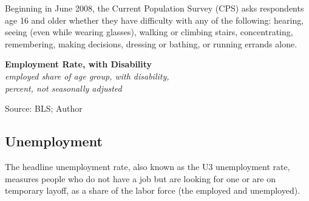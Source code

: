 \documentclass{report}
\makeatletter
\newcommand{\tbllink}[1]{\href{https://raw.githubusercontent.com/bdecon/US-chartbook/master/chartbook/data/#1}{\faTable}}
\newcommand*\short[1]{\expandafter\@gobbletwo\number\numexpr#1\relax}
\newcommand{\absnode}[3]{\node[below right, align=left] at (axis cs: #1,#2) {#3};}
\newcommand{\dateaxisticks}{
		date coordinates in=x, axis line style={draw=none},
		xmax={2023-11-30},
		max space between ticks=40,	    
		xtick={{1990-01-01}, {1992-01-01}, {1994-01-01}, 
			{1996-01-01}, {1998-01-01}, {2000-01-01}, 
			{2002-01-01}, {2004-01-01}, {2006-01-01},
			{2008-01-01}, {2010-01-01}, {2012-01-01}, {2014-01-01},
		    {2016-01-01}, {2018-01-01}, {2020-01-01}, {2022-01-01}, 
		    {2024-01-01}, {2026-01-01}},
		minor xtick={{1989-01-01}, {1991-01-01}, {1993-01-01},
			{1995-01-01}, {1997-01-01}, {1999-01-01}, 
			{2001-01-01}, {2003-01-01}, {2005-01-01}, {2007-01-01},
		    {2009-01-01}, {2011-01-01}, {2013-01-01}, {2015-01-01},
		    {2017-01-01}, {2019-01-01}, {2021-01-01}, {2023-01-01}, 
		    {2025-01-01}, {2027-01-01}},
		enlarge y limits={0.06}, enlarge x limits={0.01},
		xticklabel style={align=center, yshift=-2pt}, tick label style={inner sep=0pt},
		}
\newcommand{\bbar}[2]{extra #1 ticks = {{#2}}, extra #1 tick labels = ,
		extra #1 tick style = {grid=major, grid style={thick, black!25}},}
\newcommand{\stdline}[4]{\addplot[very thick, no markers, color=#1] 
		table [x=#2, y=#3, col sep=comma] {#4};	}
\newcommand{\recbars}{
		\fill[color=black!10] (axis cs:{2007-12-01},\pgfkeysvalueof{/pgfplots/ymin}) rectangle 
			(axis cs:{2009-07-01}, \pgfkeysvalueof{/pgfplots/ymax});
		\fill[color=black!10] (axis cs:{2020-02-01},\pgfkeysvalueof{/pgfplots/ymin}) rectangle 
			(axis cs:{2020-05-01}, \pgfkeysvalueof{/pgfplots/ymax});}
\makeatother
\begin{document}
{\begin{minipage}{0.76\textwidth}
Beginning in June 2008, the Current Population Survey (CPS) asks respondents age 16 and older whether they have difficulty with any of the following: hearing, seeing (even while wearing glasses), walking or climbing stairs, concentrating, remembering, making decisions, dressing or bathing, or running errands alone.  
\end{minipage}

\begin{minipage}{0.38\textwidth} 
\normalsize \textbf{Employment Rate, with Disability}\\
\footnotesize{\textit{employed share of age group, with disability,}}\\
\footnotesize{\textit{percent, not seasonally adjusted}}
\vspace{4.7cm}

\hspace{2mm} 

\footnotesize{Source: BLS; Author} \hfill \tbllink{dis_emp_rate_bls.csv} \ \ \tbllink{dis_emp_rate_cps.csv}
\end{minipage} \hspace{5mm}
\begin{minipage}{0.34\textwidth} 
\small  

 
\end{minipage}
\newpage
\vspace*{-10mm}

\begin{minipage}{0.76\textwidth} 
\subsection*{Unemployment}
\hypertarget{labu}{\label{labu}}
\vspace{-0.5mm}
\small The headline unemployment rate, also known as the U3 unemployment rate, measures people who do not have a job but are looking for one or are on temporary layoff, as a share of the labor force (the employed and unemployed). 
\end{minipage}

}
\end{document}
